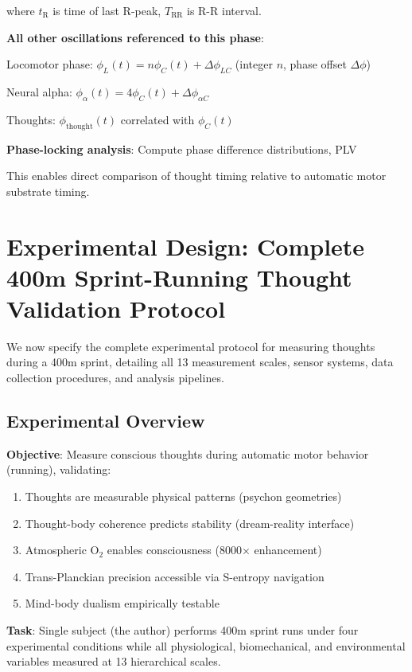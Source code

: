\documentclass[11pt,onecolumn]{article}
\begin{document}
where $t_{\text{R}}$ is time of last R-peak, $T_{\text{RR}}$ is R-R interval.

\textbf{All other oscillations referenced to this phase}:

Locomotor phase: $\phi_L(t) = n\phi_C(t) + \Delta\phi_{LC}$ (integer $n$, phase offset $\Delta\phi$)

Neural alpha: $\phi_\alpha(t) = 4\phi_C(t) + \Delta\phi_{\alpha C}$

Thoughts: $\phi_{\text{thought}}(t)$ correlated with $\phi_C(t)$

\textbf{Phase-locking analysis}: Compute phase difference distributions, PLV

This enables direct comparison of thought timing relative to automatic motor substrate timing.

\clearpage

\section{Experimental Design: Complete 400m Sprint-Running Thought Validation Protocol}

We now specify the complete experimental protocol for measuring thoughts during a 400m sprint, detailing all 13 measurement scales, sensor systems, data collection procedures, and analysis pipelines.

\subsection{Experimental Overview}

\textbf{Objective}: Measure conscious thoughts during automatic motor behavior (running), validating:
\begin{enumerate}
\item Thoughts are measurable physical patterns (psychon geometries)
\item Thought-body coherence predicts stability (dream-reality interface)
\item Atmospheric O$_2$ enables consciousness (8000$\times$ enhancement)
\item Trans-Planckian precision accessible via S-entropy navigation
\item Mind-body dualism empirically testable
\end{enumerate}

\textbf{Task}: Single subject (the author) performs 400m sprint runs under four experimental conditions while all physiological, biomechanical, and environmental variables measured at 13 hierarchical scales.
\end{document}
